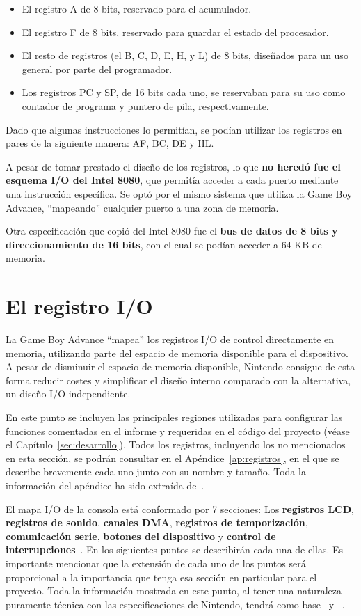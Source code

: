 \begin{itemize}
\item El registro A de 8 bits, reservado para el acumulador.
\item El registro F de 8 bits, reservado para guardar el estado del procesador.
\item El resto de registros (el B, C, D, E, H, y L) de 8 bits, diseñados para un uso general por parte del programador.
\item Los registros PC y SP, de 16 bits cada uno, se reservaban para su uso como contador de programa y puntero de pila, respectivamente.
\end{itemize}

Dado que algunas instrucciones lo permitían, se podían utilizar los registros en pares de la siguiente manera: AF, BC, DE y HL.

A pesar de tomar prestado el diseño de los registros, lo que \textbf{no heredó fue el esquema I/O del Intel 8080}, que permitía acceder a cada puerto mediante una instrucción específica. Se optó por el mismo sistema que utiliza la Game Boy Advance, ``mapeando'' cualquier puerto a una zona de memoria.

Otra especificación que copió del Intel 8080 fue el \textbf{bus de datos de 8 bits y direccionamiento de 16 bits}, con el cual se podían acceder a 64 KB de memoria.

\section{El registro I/O}

La Game Boy Advance ``mapea'' los registros I/O de control directamente en memoria, utilizando parte del espacio de memoria disponible para el dispositivo. A pesar de disminuir el espacio de memoria disponible, Nintendo consigue de esta forma reducir costes y simplificar el diseño interno comparado con la alternativa, un diseño I/O independiente.

En este punto se incluyen las principales regiones utilizadas para configurar las funciones comentadas en el informe y requeridas en el código del proyecto (véase el Capítulo~\ref{sec:desarrollo}). Todos los registros, incluyendo los no mencionados en esta sección, se podrán consultar en el Apéndice~\ref{ap:registros}, en el que se describe brevemente cada uno junto con su nombre y tamaño. Toda la información del apéndice ha sido extraída de~\cite{bib:gbatek}.

El mapa I/O de la consola está conformado por 7 secciones: Los \textbf{registros LCD}, \textbf{registros de sonido}, \textbf{canales DMA}, \textbf{registros de temporización}, \textbf{comunicación serie}, \textbf{botones del dispositivo} y \textbf{control de interrupciones}~\cite{bib:gbatek}. En los siguientes puntos se describirán cada una de ellas. Es importante mencionar que la extensión de cada uno de los puntos será proporcional a la importancia que tenga esa sección en particular para el proyecto. Toda la información mostrada en este punto, al tener una naturaleza puramente técnica con las especificaciones de Nintendo, tendrá como base~\cite{bib:gba_manual} y~\cite{bib:gbatek} .

